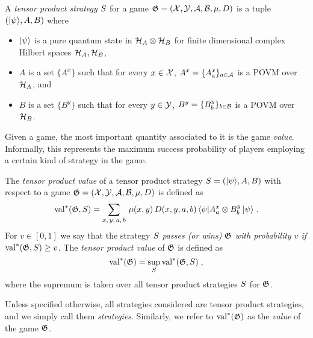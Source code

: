 \begin{definition}
  \label{definition-tensorstrategy}
  A \emph{tensor product strategy} $\strategy$ for a game $\game = (\cal{X},
  \cal{Y}, \cal{A}, \cal{B}, \mu, D)$ is a tuple $(\ket{\psi}, A, B)$ where
  \begin{itemize}
	\item $\ket{\psi}$ is a pure quantum state in $\mH_A \otimes \mH_B$ for finite
    dimensional complex Hilbert spaces $\mH_A, \mH_B$,
	\item $A$ is a set $\{A^x\}$ such that for every $x \in \cal{X}$, $A^x =
    \{A^x_a \}_{a \in \cal{A}}$ is a POVM over $\mH_A$, and
	\item $B$ is a set $\{B^y\}$ such that for every $y \in \cal{Y}$, $B^y =
    \{B^y_b \}_{b \in \cal{B}}$ is a POVM over $\mH_B$.
\end{itemize}
\end{definition}

Given a game, the most important quantity associated to it is the game \emph{value}. Informally, this represents the maximum success probability of players employing a certain kind of strategy in the game.  

\begin{definition}
  \label{definition-tensor-value}
	The \emph{tensor product value} of a tensor product strategy $\strategy =
  (\ket{\psi}, A, B)$  with respect to a game $\game=(\cal{X}, \cal{Y}, \cal{A},
  \cal{B}, \mu, D)$ is defined as
  \begin{equation*}
		\val^*(\game, \strategy) = \sum_{x,\, y,\, a,\, b} \, \mu(x,y)\, D(x,y,a,b)\,
    \bra{\psi} A^x_a \otimes B^y_b\, \ket{\psi}\;.
  \end{equation*}
	For $v\in[0,1]$ we say that the strategy $\strategy$ \emph{passes (or wins)
    $\game$ with probability $v$ if} $\val^*(\game, \strategy) \geq v$.
  The \emph{tensor product value} of $\game$ is defined as
  \begin{equation*}
		\val^*(\game) = \sup_\strategy \val^*(\game, \strategy)\;,
  \end{equation*}
	where the supremum is taken over all tensor product strategies $\strategy$ for
  $\game$.
\end{definition}


\begin{remark}
  Unless specified otherwise, all strategies considered  are tensor
  product strategies, and we simply call them \emph{strategies}.
  Similarly, we refer to $\val^*(\game)$ as the \emph{value} of the game
  $\game$.
\end{remark}


